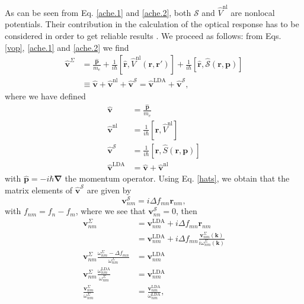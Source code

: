 As can be seen from Eq. \eqref{ache.1} and \eqref{ache.2}, both $\mathcal{S}$
and $\hat{V}^{\mathrm{nl}}$ are nonlocal potentials. Their contribution in the
calculation of the optical response has to be considered in order to get
reliable results \cite{ismailPRL01}. We proceed as follows: from Eqs.
\eqref{vop}, \eqref{ache.1} and \eqref{ache.2} we find
\begin{align}\label{vop2}
\hat{\mathbf{v}}^{\Sigma} &=
\frac{\hat{\mathbf{p}}}{m_{e}} + \frac{1}{i\hbar}
\left[\hat{\mathbf{r}},\hat{V}^{\mathrm{nl}}(\mathbf{r},\mathbf{r}')\right]
+ \frac{1}{i\hbar}
  \left[\hat{\mathbf{r}},\hat{\mathcal{S}}(\mathbf{r},\mathbf{p})\right]
\nonumber\\
&\equiv
  \hat{\mathbf{v}} + \hat{\mathbf{v}}^{\mathrm{nl}} 
+ \hat{\mathbf{v}}^{\mathcal{S}}
= \hat{\mathbf{v}}^\mathrm{LDA} + \hat{\mathbf{v}}^{\mathcal{S}},
\end{align}
where we have defined
\begin{equation}\label{conhr}
\begin{split}
\hat{\mathbf{v}} &=\frac{\hat{\mathbf{p}}}{m_{e}}\\
\hat{\mathbf{v}}^{\mathrm{nl}} &= \frac{1}{i\hbar}
  \left[\hat{\mathbf{r}},\hat{V}^{\mathrm{nl}}\right]\\
\hat{\mathbf{v}}^{\mathcal{S}} &= \frac{1}{i\hbar}
  \left[\hat{\mathbf{r}},\hat{S}(\mathbf{r},\mathbf{p})\right]\\
\hat{\mathbf{v}}^\mathrm{LDA} &= \hat{\mathbf{v}}+\hat{\mathbf{v}}^{\mathrm{nl}}
\end{split}
\end{equation}  
with $\hat{\mathbf{p}}= -i\hbar\boldsymbol{\nabla}$ the momentum operator. Using
Eq. \eqref{hats}, we obtain that the matrix elements of
$\hat{\mathbf{v}}^{\mathcal{S}}$ are given by
\begin{equation}\label{chon.2} 
\mathbf{v}^{\mathcal{S}}_{nm} = i\Delta f_{mn}\mathbf{r}_{nm},
\end{equation}
with $f_{nm} = f_{n} - f_{m}$, where we see that $\mathbf{v}^{\mathcal{S}}_{nn}
= 0$, then
\begin{align}\label{chon.8}
\mathbf{v}^\Sigma_{nm} 
&= \mathbf{v}^\mathrm{LDA}_{nm} + i\Delta f_{mn}\mathbf{r}_{nm}\nonumber\\
&= \mathbf{v}^\mathrm{LDA}_{nm} + i\Delta f_{mn}
   \frac{\mathbf{v}^\Sigma_{nm}(\mathbf{k})}{i\omega^\Sigma_{nm}(\mathbf{k})}
   \nonumber\\
\mathbf{v}^\Sigma_{nm}
  \frac{\omega^\Sigma_{nm}-\Delta f_{mn}}{\omega^\Sigma_{nm}}
&= \mathbf{v}^\mathrm{LDA}_{nm}\nonumber\\
\mathbf{v}^\Sigma_{nm}\frac{\omega^{\mathrm{LDA}}_{nm}}{\omega^\Sigma_{nm}}
&= \mathbf{v}^\mathrm{LDA}_{nm}\nonumber\\
\frac{\mathbf{v}^\Sigma_{nm}}{\omega^\Sigma_{nm}}
&= \frac{\mathbf{v}^\mathrm{LDA}_{nm}}{\omega^{\mathrm{LDA}}_{nm}},
\end{align}
